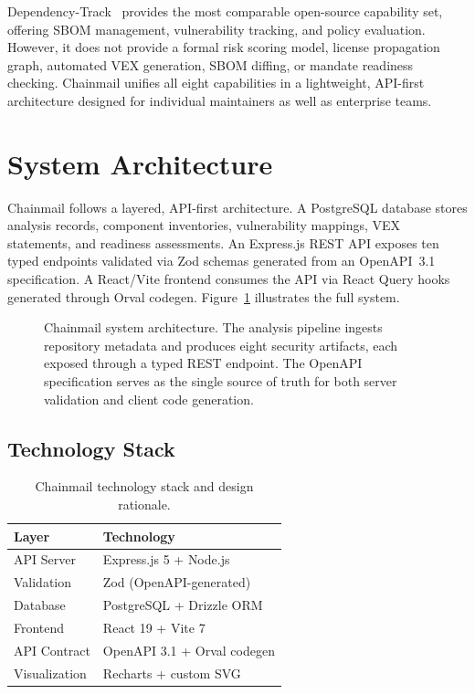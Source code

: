 \documentclass[11pt,twocolumn]{article}
\begin{document}
Dependency-Track~\cite{deptrack} provides the most comparable open-source
capability set, offering SBOM management, vulnerability tracking, and policy
evaluation. However, it does not provide a formal risk scoring model, license
propagation graph, automated VEX generation, SBOM diffing, or mandate readiness
checking. Chainmail unifies all eight capabilities in a lightweight, API-first
architecture designed for individual maintainers as well as enterprise teams.

\section{System Architecture}

Chainmail follows a layered, API-first architecture. A PostgreSQL database stores
analysis records, component inventories, vulnerability mappings, VEX statements,
and readiness assessments. An Express.js REST API exposes ten typed endpoints
validated via Zod schemas generated from an OpenAPI~3.1 specification. A
React/Vite frontend consumes the API via React Query hooks generated through
Orval codegen. Figure~\ref{fig:arch} illustrates the full system.

\begin{figure}[t]
  \centering
  
  \caption{Chainmail system architecture. The analysis pipeline ingests repository
  metadata and produces eight security artifacts, each exposed through a typed REST
  endpoint. The OpenAPI specification serves as the single source of truth for both
  server validation and client code generation.}
  \label{fig:arch}
\end{figure}

\subsection{Technology Stack}

\begin{table}[H]
\centering
\small
\caption{Chainmail technology stack and design rationale.}
\begin{tabularx}{\columnwidth}{lX}
\toprule
\textbf{Layer} & \textbf{Technology} \\
\midrule
API Server  & Express.js 5 + Node.js \\
Validation  & Zod (OpenAPI-generated) \\
Database    & PostgreSQL + Drizzle ORM \\
Frontend    & React 19 + Vite 7 \\
API Contract & OpenAPI 3.1 + Orval codegen \\
Visualization & Recharts + custom SVG \\
\bottomrule
\end{tabularx}
\end{table}
\end{document}
